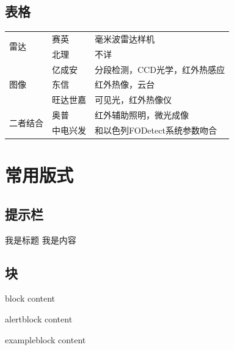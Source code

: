 \documentclass{./banyuan-ppt}
\begin{document}
\subsection{表格}
\begin{frame}
    \begin{table}
    \centering
    \begin{tabular}{lll}
    \hline
    \multirow{2}{*}{\centering  雷达}  &  赛英  &  毫米波雷达样机  \\
    & 北理 & 不详 \\
    \hline
    \multirow{3}{*}{\centering  图像}   &  亿成安  &  分段检测，CCD光学，红外热感应  \\
    & 东信  &  红外热像，云台  \\
    & 旺达世嘉 & 可见光，红外热像仪 \\
    \hline
    \multirow{2}{*}{\centering  二者结合} & 奥普 & 红外辅助照明，微光成像 \\
    & 中电兴发 & 和以色列FODetect系统参数吻合 \\
    \hline
    \end{tabular}
    \end{table}
\end{frame}

\section{常用版式}
\subsection{提示栏}
\begin{frame}{我是标题}
    我是内容
\end{frame}

\subsection{块}
\begin{frame}
    \begin{block}{block}
        content
    \end{block}
    
    \begin{alertblock}{alertblock}
        content
    \end{alertblock}

    \begin{exampleblock}{exampleblock}
        content
    \end{exampleblock}
\end{frame}
\end{document}
